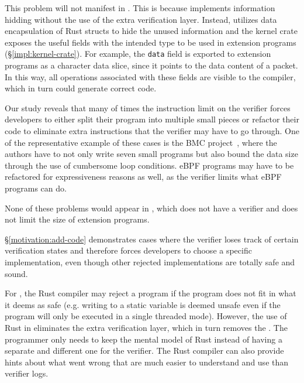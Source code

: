 This problem will not manifest in \projname{}.
This is because \projname{} implements information hidding without the use of
    the extra verification layer.
Instead, \projname{} utilizes data encapsulation of Rust structs to hide the
    unused information and the kernel crate exposes the useful fields with the
    intended type to be used in extension programs (\S\ref{impl:kernel-crate}).
For example, the \texttt{data} field is exported to extension programs as a
    character data slice, since it points to the data content of a packet.
In this way, all operations associated with these fields are visible to the
    compiler, which in turn could generate correct code.

Our study reveals that many of times the instruction limit on the verifier
    forces developers to either split their program into multiple small pieces
    or refactor their code to eliminate extra instructions that the verifier
    may have to go through.
One of the representative example of these cases is the BMC project~\cite{BMC},
    where the authors have to not only write seven small programs but also
    bound the data size through the use of cumbersome loop conditions.
eBPF programs may have to be refactored for expressiveness reasons as well,
    as the verifier limits what eBPF programs can do.

None of these problems would appear in \projname{}, which does not
    have a verifier and does not limit the size of extension programs.


\S\ref{motivation:add-code} demonstrates cases where the verifier loses track
    of certain verification states and therefore forces developers to
    choose a specific implementation, even though other rejected
    implementations are totally safe and sound.

For \projname{}, the Rust compiler may reject a program if the program does not
    fit in what it deems as safe (e.g. writing to a static variable is deemed
    unsafe even if the program will only be executed in a single threaded
    mode).
However, the use of Rust in \projname{} eliminates the extra verification layer,
    which in turn removes the \gap{}. %
The programmer only needs to keep the mental model of Rust instead of having a
    separate and different one for the verifier.
The Rust compiler can also provide hints about what went wrong that are much
    easier to understand and use than verifier logs.

